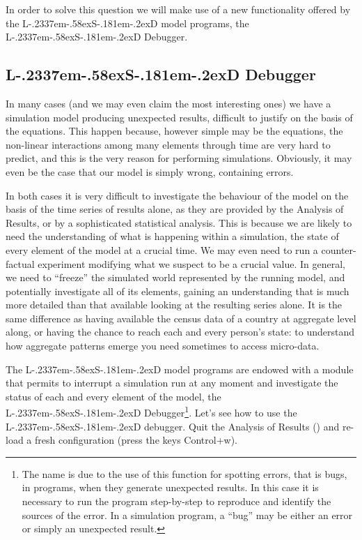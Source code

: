 \documentclass [11pt,a4paper] {book}
\def\LsD{{L\kern-.2337em\lower-.58ex\hbox{S}\kern-.181em\lower-.2ex\hbox{D}}\xspace}
\begin{document}
In order to solve this question we will make use of a new functionality offered by the \LsD
model programs, the \LsD Debugger.

\subsection{\LsD Debugger}
In many cases (and we may even claim the most interesting ones) we have a simulation model producing unexpected results, difficult to justify on the basis of the equations. This happen because, however simple may be the equations, the non-linear interactions among many elements through time are very hard to predict, and this is the very reason for performing simulations. Obviously, it may even be the case that our model is simply wrong, containing errors. 

In both cases it is very difficult to investigate the behaviour of the model on the basis of the time series of results alone, as they are provided by the Analysis of Results, or by a sophisticated statistical analysis. This is because we are likely to need the understanding of what is happening within a simulation, the state of every element of the model at a crucial time. We may even need to run a counter-factual experiment modifying what we suspect to be a crucial value. In general, we need to ``freeze'' the simulated world represented by the running model, and potentially investigate all of its elements, gaining an understanding that is much more detailed than that available looking at the resulting series alone. It is the same difference as having available the census data of a country at aggregate level along, or having the chance to reach each and every person's state: to understand how aggregate patterns emerge you need sometimes to access micro-data.


The \LsD model programs are endowed with a module that permits to interrupt a simulation
run at any moment and investigate the status of each and every element of the model, the
\LsD Debugger\footnote{The name is due to the use of this function for spotting errors,
that is bugs, in programs, when they generate unexpected results. In this case it is necessary to run the program step-by-step to reproduce and identify the sources of the error. In a simulation program, a ``bug'' may be either an error or simply an unexpected result.}.
Let's see how to use the \LsD debugger. Quit the Analysis of Results () and re-load a fresh
configuration (press the keys Control+w).
\end{document}
